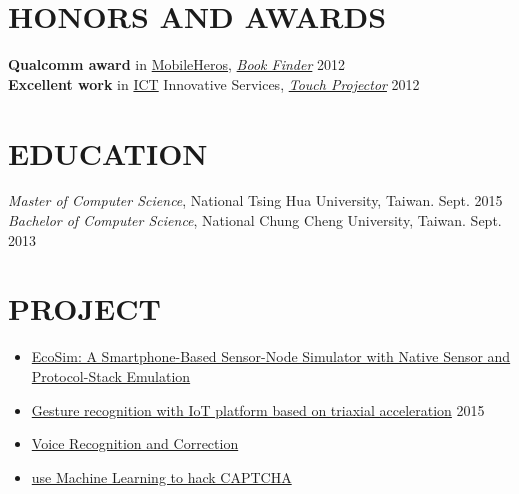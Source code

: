 \documentclass{res}
\begin{document}
\begin{resume}
			

			\section{HONORS AND AWARDS}          
				{\bf Q​ualcomm award} in \href{https://www.mobilehero.com/component/k2/item/209-a2012_11-10.html?Itemid=196}{MobileHeros}, \href{https://www.youtube.com/watch?v=BvLKtrgq_yw}{\sl B​ook Finder} \hfill 2012\\
				{\bf Excellent work} in \href{http://innoserve.tca.org.tw/en/index.aspx}{ICT} Innovative Services, \href{https://www.youtube.com/watch?v=nt4eUAXqXyk}{\sl T​ouch Projector​} \hfill 2012\\  

			\vspace{-0.2in}
			\section{EDUCATION}
			\vspace{0.1in}
				{\sl Master of Computer Science}, National Tsing Hua University, Taiwan. \hfill Sept. 2015\\
				{\sl B​achelor of Computer Science}, ​National Chung Cheng University, Taiwan. \hfill Sept. 2013\\


			\section{PROJECT}
			\begin{itemize}
					\item \href{https://www.youtube.com/watch?v=1UUcqf0pjM0}{EcoSim: A Smartphone-Based Sensor-Node Simulator with Native Sensor and Protocol-Stack Emulation}
					\vspace{-0.05in}
					\item \href{https://www.youtube.com/watch?v=VInyJABrmPo}{Gesture recognition with IoT platform based on triaxial acceleration}  \hfill2​015
					\vspace{-0.05in}
					\item \href{https://www.youtube.com/watch?v=xZo-bpWrYlk}{Voice Recognition and Correction}
					\vspace{-0.05in}
					\item  \href{https://www.youtube.com/watch?v=9ovWzIu1zy8}{use Machine Learning to hack CAPTCHA}							
			\end{itemize}
				

				          
			 
		\end{resume}
	
\end{document}
